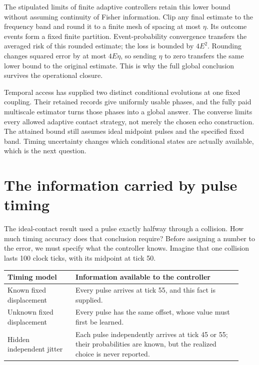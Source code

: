 \documentclass[11pt,a4paper]{article}
\numberwithin{equation}{section}
\theoremstyle{remark}
\begin{document}
The stipulated limits of finite adaptive controllers retain this lower
bound without assuming continuity of Fisher information. Clip any final
estimate to the frequency band and round it to a finite mesh of spacing
at most $\eta$. Its outcome events form a fixed finite partition.
Event-probability convergence transfers the averaged risk of this rounded
estimate; the loss is bounded by $4E^2$. Rounding changes squared error
by at most $4E\eta$, so sending $\eta$ to zero transfers the same lower
bound to the original estimate. This is why the full global conclusion
survives the operational closure.

Temporal access has supplied two distinct conditional evolutions at one
fixed coupling. Their retained records give uniformly usable phases, and
the fully paid multiscale estimator turns those phases into a global
answer. The converse limits every allowed adaptive contact strategy,
not merely the chosen echo construction. The attained bound still assumes
ideal midpoint pulses and the specified fixed band. Timing uncertainty
changes which conditional states are actually available, which is the
next question.


\section{The information carried by pulse timing}
\label{tim:section}

The ideal-contact result used a pulse exactly halfway through a collision.
How much timing accuracy does that conclusion require? Before assigning a
number to the error, we must specify what the controller knows. Imagine that
one collision lasts 100 clock ticks, with its midpoint at tick 50.

\begin{center}
\begin{tabular}{@{}>{\raggedright\arraybackslash}p{0.27\linewidth}
                   >{\raggedright\arraybackslash}p{0.66\linewidth}@{}}
\toprule
Timing model & Information available to the controller\\
\midrule
Known fixed displacement & Every pulse arrives at tick 55, and this fact is supplied.\\
Unknown fixed displacement & Every pulse has the same offset, whose value must first be learned.\\
Hidden independent jitter & Each pulse independently arrives at tick 45 or 55; their probabilities are known, but the realized choice is never reported.\\
\bottomrule
\end{tabular}
\end{center}
\end{document}
